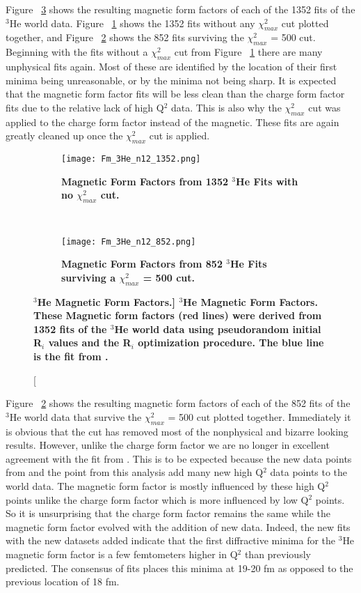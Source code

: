 Figure ~\ref{fig:3he_fm} shows the resulting magnetic form factors of each of the 1352 fits of the $^3$He world data. Figure ~\ref{fig:3he_fm_no_cut} shows the 1352 fits without any $\chi^2_{max}$ cut plotted together, and Figure ~\ref{fig:3he_fm_cut} shows the 852 fits surviving the $\chi^2_{max}$ = 500 cut. Beginning with the fits without a $\chi^2_{max}$ cut from Figure ~\ref{fig:3he_fm_no_cut} there are many unphysical fits again. Most of these are identified by the location of their first minima being unreasonable, or by the minima not being sharp. It is expected that the magnetic form factor fits will be less clean than the charge form factor fits due to the relative lack of high Q$^2$ data. This is also why the $\chi^2_{max}$ cut was applied to the charge form factor instead of the magnetic. These fits are again greatly cleaned up once the $\chi^2_{max}$ cut is applied.

\begin{figure}[!ht]
\begin{subfigure}{1.\textwidth}
  \centering
  \texttt{[image: Fm\_3He\_n12\_1352.png]}
  \caption{\bf{Magnetic Form Factors from 1352 $^3$He Fits with no $\chi^2_{max}$ cut.}}
  \label{fig:3he_fm_no_cut}
\end{subfigure}\\
\begin{subfigure}{1.\textwidth}
  \centering
  \texttt{[image: Fm\_3He\_n12\_852.png]}
  \caption{\bf{Magnetic Form Factors from 852 $^3$He Fits surviving a $\chi^2_{max}$ = 500 cut.}}
  \label{fig:3he_fm_cut}
\end{subfigure}
\caption[\bf{$^3$He Magnetic Form Factors.}] {
{\bf{$^3$He Magnetic Form Factors.}} These Magnetic form factors (red lines) were derived from 1352 fits of the $^3$He world data using pseudorandom initial R$_i$ values and the R$_i$ optimization procedure. The blue line is the fit from \cite{Article:Amroun}.}
\label{fig:3he_fm}
\end{figure}

Figure ~\ref{fig:3he_fm_cut} shows the resulting magnetic form factors of each of the 852 fits of the $^3$He world data that survive the $\chi^2_{max}$ = 500 cut plotted together. Immediately it is obvious that the cut has removed most of the nonphysical and bizarre looking results. However, unlike the charge form factor we are no longer in excellent agreement with the fit from \cite{Article:Amroun}. This is to be expected because the new data points from \cite{Article:Alex} and the point from this analysis add many new high Q$^2$ data points to the world data. The magnetic form factor is mostly influenced by these high Q$^2$ points unlike the charge form factor which is more influenced by low Q$^2$ points. So it is unsurprising that the charge form factor remains the same while the magnetic form factor evolved with the addition of new data. Indeed, the new fits with the new datasets added indicate that the first diffractive minima for the $^3$He magnetic form factor is a few femtometers higher in Q$^2$ than previously predicted. The consensus of fits places this minima at 19-20 fm as opposed to the previous location of 18 fm.  


